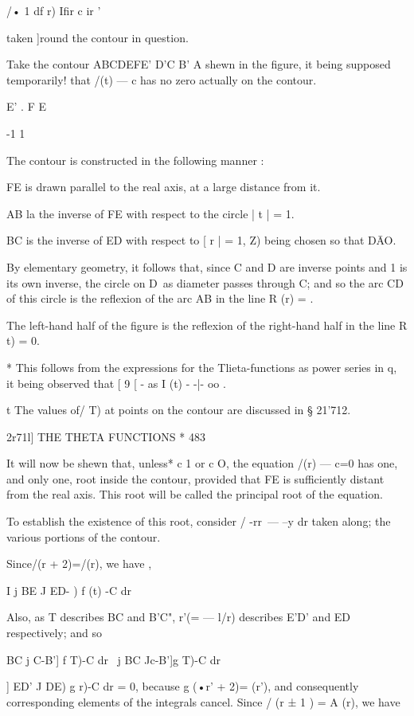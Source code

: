 /• 1 df r) Ifir c ir '

taken ]round the contour in question.

Take the contour ABCDEFE' D'C B' A shewn in the figure, it being
supposed temporarily! that /(t) — c has no zero actually on the
contour.

E' . F E

-1 1

The contour is constructed in the following manner :

FE is drawn parallel to the real axis, at a large distance from it.

AB la the inverse of FE with respect to the circle | t | = 1.

BC is the inverse of ED with respect to [ r | = 1, Z) being chosen so
that D\=AO.

By elementary geometry, it follows that, since C and D are inverse
points and 1 is its own inverse, the circle on D\ as diameter passes
through C; and so the arc CD of this circle is the reflexion of the
arc AB in the line R (r) = .

The left-hand half of the figure is the reflexion of the right-hand
half in the line R t) = 0.

* This follows from the expressions for the Tlieta-functions as power
series in q, it being observed that [ 9 [ - as I (t) - -|- oo .

t The values of/ T) at points on the contour are discussed in §
21'712.

2r71l] THE THETA FUNCTIONS * 483

It will now be shewn that, unless* c 1 or c O, the equation /(r) — c=0
has one, and only one, root inside the contour, provided that FE is
sufficiently distant from the real axis. This root will be called the
principal root of the equation.

To establish the existence of this root, consider / -rr\ — --y dr
taken along; the various portions of the contour.

Since/(r + 2)=/(r), we have ,

I j BE J ED- ) f (t) -C dr

Also, as T describes BC and B'C", r'(= — l/r) describes E'D' and ED
respectively; and so

   BC j C-B'] f T)-C dr \ j BC Jc-B']g T)-C dr

 ] ED' J DE) g r)-C dr = 0, because g (•r' + 2)= (r'), and
consequently corresponding elements of the integrals cancel. Since /
(r ± 1 ) = A (r), we have

